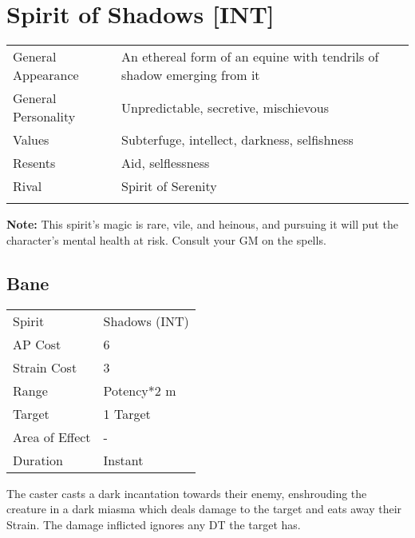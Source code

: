 \documentclass[11pt,a4paper,twocolumn]{book}
\begin{document}
\vfill

\section*{Spirit of Shadows [INT]}
{
	\begin{tabu} to 75mm{| X[l,4] | X[l,8] |}
		\hline
		General Appearance  & An ethereal form of an equine with tendrils of shadow emerging from it \\
		General Personality & Unpredictable, secretive, mischievous                         \\
		Values              & Subterfuge, intellect, darkness, selfishness                                                \\
		Resents             & Aid, selflessness                                        \\
		Rival               & Spirit of Serenity                                                       \\
		                    &                                                                          \\ \hline
	\end{tabu}
	
}

\textbf{Note:} This spirit's magic is rare, vile, and heinous, and pursuing it will put the character's mental health at risk. Consult your GM on the spells.
\medskip

\subsection*{Bane}
{
	\begin{tabu} to 70mm{| X[l,4] | X[l,7] |}
		\hline
		Spirit         & Shadows (INT) \\
		AP Cost        & 6             \\
		Strain Cost    & 3             \\
		Range          & Potency*2 m   \\
		Target         & 1 Target      \\
		Area of Effect & -             \\
		Duration       & Instant       \\ \hline
	\end{tabu}
	
}
\medskip
The caster casts a dark incantation towards their enemy, enshrouding the creature in a dark miasma which deals damage to the target and eats away their Strain. The damage inflicted ignores any DT the target has.
\end{document}
